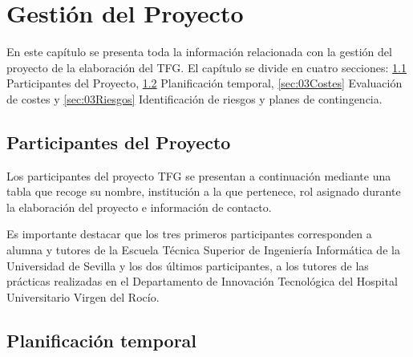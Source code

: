 \chapter{Gestión del Proyecto}\label{cap:03gestión}

En este capítulo se presenta toda la información relacionada con la gestión del proyecto de la elaboración del TFG. El capítulo se divide en cuatro secciones: \ref{sec:03Participantes} Participantes del Proyecto,
\ref{sec:03Temporal} Planificación temporal, \ref{sec:03Costes} Evaluación de costes y \ref{sec:03Riesgos} Identificación de riesgos y planes de contingencia.

\section{Participantes del Proyecto} \label{sec:03Participantes}

Los participantes del proyecto TFG se presentan a continuación mediante una tabla que recoge su nombre, institución a la que pertenece, rol asignado durante la elaboración del proyecto e información de contacto. 

Es importante destacar que los tres primeros participantes corresponden a alumna y tutores de la Escuela Técnica Superior de Ingeniería Informática de la Universidad de Sevilla y los dos últimos participantes, a los tutores de las prácticas realizadas en el Departamento de Innovación Tecnológica del Hospital Universitario Virgen del Rocío.












\section{Planificación temporal} \label{sec:03Temporal}

